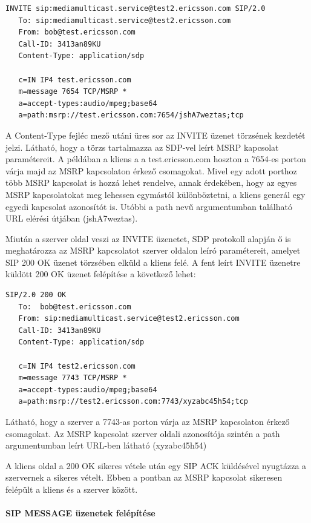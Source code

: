 \fontsize{10}{10}
\begin{verbatim}
INVITE sip:mediamulticast.service@test2.ericsson.com SIP/2.0
   To: sip:mediamulticast.service@test2.ericsson.com
   From: bob@test.ericsson.com
   Call-ID: 3413an89KU
   Content-Type: application/sdp

   c=IN IP4 test.ericsson.com
   m=message 7654 TCP/MSRP *
   a=accept-types:audio/mpeg;base64
   a=path:msrp://test.ericsson.com:7654/jshA7weztas;tcp
\end{verbatim}
\fontsize{12}{12} 

A Content-Type fejléc mező utáni üres sor az INVITE üzenet törzsének kezdetét jelzi. Látható, hogy a  törzs tartalmazza az SDP-vel leírt MSRP kapcsolat paramétereit. A példában a kliens a a test.ericsson.com hoszton a 7654-es porton várja majd az MSRP kapcsolaton érkező csomagokat. Mivel egy adott porthoz több MSRP kapcsolat is hozzá lehet rendelve, annak érdekében, hogy az egyes MSRP kapcsolatokat meg lehessen egymástól különböztetni, a kliens generál egy egyedi kapcsolat azonosítót is. Utóbbi a path nevű argumentumban található URL elérési útjában (jshA7weztas). 

Miután a szerver oldal veszi az INVITE üzenetet, SDP protokoll alapján ő is meghatározza az MSRP kapcsolatot szerver oldalon leíró paramétereit, amelyet SIP 200 OK üzenet törzsében elküld a kliens felé. A fent leírt INVITE üzenetre küldött 200 OK üzenet felépítése a következő lehet:

\fontsize{10}{10}
\begin{verbatim}
SIP/2.0 200 OK
   To:  bob@test.ericsson.com
   From: sip:mediamulticast.service@test2.ericsson.com
   Call-ID: 3413an89KU
   Content-Type: application/sdp

   c=IN IP4 test2.ericsson.com
   m=message 7743 TCP/MSRP *
   a=accept-types:audio/mpeg;base64
   a=path:msrp://test2.ericsson.com:7743/xyzabc45h54;tcp
\end{verbatim}
\fontsize{12}{12} 
 
Látható, hogy a szerver a 7743-as porton várja az MSRP kapcsolaton érkező csomagokat. Az MSRP kapcsolat szerver oldali azonosítója szintén a path argumentumban leírt URL-ben látható (xyzabc45h54)

A kliens oldal a 200 OK sikeres vétele után egy SIP ACK küldésével nyugtázza a szervernek a sikeres vételt. Ebben a pontban az MSRP kapcsolat sikeresen felépült a kliens és a szerver között.

\paragraph{SIP MESSAGE üzenetek felépítése\\}
\label{sec:sip_message}

